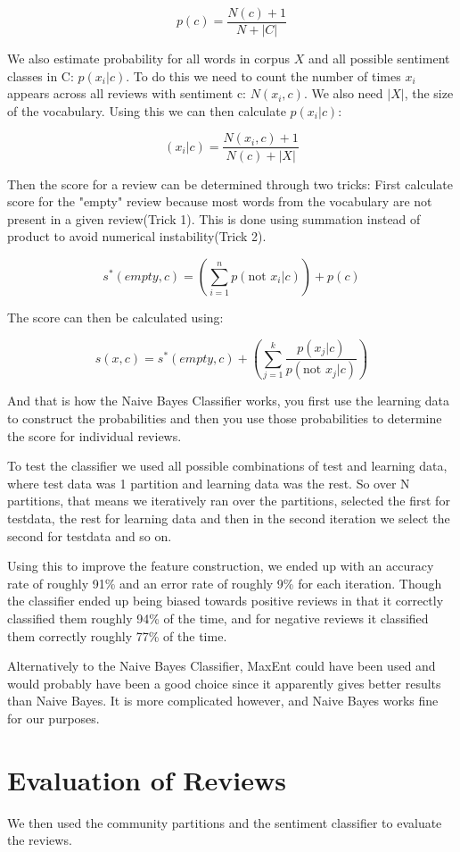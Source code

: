 	$$p(c) = \frac{N(c) + 1}{N +|C|}$$
	
	We also estimate probability for all words in corpus $X$ and all possible sentiment classes in C: $p(x_i | c)$. 
	To do this we need to count the number of times $x_i$ appears across all reviews with sentiment c: $N(x_i, c)$. We also need $|X|$, the size of the vocabulary. Using this we can then calculate $p(x_i|c)$:
	
	$$(x_i|c) = \frac{N(x_{i}, c) + 1}{N(c) + |X|}$$
	
	Then the score for a review can be determined through two tricks:
	First calculate score for the "empty" review because most words from the vocabulary are not present in a given review(Trick 1). This is done using summation instead of product to avoid numerical instability(Trick 2).
	
	$$s^{*}(empty, c) = (\sum\limits_{i=1}^{n} p(\text{not } x_i | c)) + p(c)$$
	
	The score can then be calculated using:
	
	$$s(x, c) = s^{*}(empty, c) + (\sum\limits_{j=1}^{k} \frac{p(x_{j}|c)}{p(\text{not } x_{j}|c)})$$
	
	And that is how the Naive Bayes Classifier works, you first use the learning data to construct the probabilities and then you use those probabilities to determine the score for individual reviews.
	
	To test the classifier we used all possible combinations of test and learning data, where test data was 1 partition and learning data was the rest. So over N partitions, that means we iteratively ran over the partitions, selected the first for testdata, the rest for learning data and then in the second iteration we select the second for testdata and so on.
	
	Using this to improve the feature construction, we ended up with an accuracy rate of roughly 91\% and an error rate of roughly 9\% for each iteration. Though the classifier ended up being biased towards positive reviews in that it correctly classified them roughly 94\% of the time, and for negative reviews it classified them correctly roughly 77\% of the time.
	
	Alternatively to the Naive Bayes Classifier, MaxEnt could have been used and would probably have been a good choice since it apparently gives better results than Naive Bayes. It is more complicated however, and Naive Bayes works fine for our purposes. 
	
	\section{Evaluation of Reviews}
	We then used the community partitions and the sentiment classifier to evaluate the reviews. 

